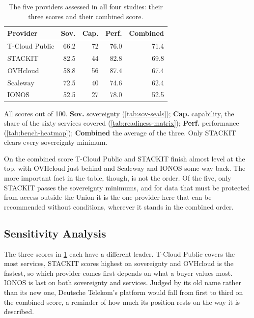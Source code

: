 \begin{table}[htbp]
  \centering
  \caption{The five providers assessed in all four studies: their three scores
           and their combined score.}
  \label{tab:combined-ranking}
  \small
  \begin{tabular}{@{}l r r r r@{}}
    \toprule
    \textbf{Provider} & \textbf{Sov.} & \textbf{Cap.} & \textbf{Perf.}
      & \textbf{Combined} \\
    \midrule
    T-Cloud Public & 66.2 & 72 & 76.0 & 71.4 \\
    STACKIT        & 82.5 & 44 & 82.8 & 69.8 \\
    OVHcloud       & 58.8 & 56 & 87.4 & 67.4 \\
    Scaleway       & 72.5 & 40 & 74.6 & 62.4 \\
    IONOS          & 52.5 & 27 & 78.0 & 52.5 \\
    \bottomrule
  \end{tabular}

  \vspace{4pt}
  {\footnotesize\raggedright
  All scores out of 100. \textbf{Sov.} sovereignty (\cref{tab:sov-seals});
  \textbf{Cap.} capability, the share of the sixty services covered
  (\cref{tab:readiness-matrix}); \textbf{Perf.} performance
  (\cref{tab:bench-heatmap}); \textbf{Combined} the average of the three. Only
  STACKIT clears every sovereignty minimum.\par}
\end{table}

On the combined score T-Cloud Public and STACKIT finish almost level at the top, with
OVHcloud just behind and Scaleway and IONOS some way back. The more important fact
in the table, though, is not the order. Of the five, only STACKIT passes the
sovereignty minimums, and for data that must be protected from access outside the
Union it is the one provider here that can be recommended without conditions,
wherever it stands in the combined order.

\subsection{Sensitivity Analysis}
\label{subsec:sensitivity}

The three scores in \cref{tab:combined-ranking} each have a different leader.
T-Cloud Public covers the most services, STACKIT scores highest on sovereignty and
OVHcloud is the fastest, so which provider comes first depends on what a buyer
values most. IONOS is last on both sovereignty and services. Judged by its old
name rather than its new one, Deutsche Telekom's platform would fall from first to
third on the combined score, a reminder of how much its position rests on the way
it is described.

